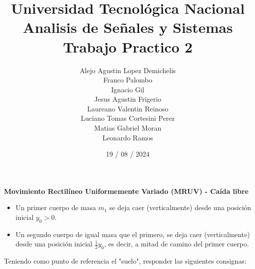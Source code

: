 \documentclass[12pt,a4paper]{report}
\title{%
  \fontsize{25}{0}\selectfont Universidad Tecnológica Nacional \\
  \fontsize{22}{30}\selectfont Analisis de Señales y Sistemas \\
  \fontsize{20}{25}\selectfont Trabajo Practico 2
}
\author{
Alejo Agustin Lopez Demichelis\\
Franco Palombo\\
Ignacio Gil\\
Jesus Agustin Frigerio\\
Laureano Valentin Reinoso\\
Luciano Tomas Cortesini Perez\\
Matias Gabriel Moran\\
Leonardo Ramos\\
}
\date{19 / 08 / 2024}
\begin{document}
\maketitle

\chapter{}%

\textbf{Movimiento Rectilíneo Uniformemente Variado (MRUV) - Caída libre}

\begin{itemize}[left=0pt]
  \item Un primer cuerpo de masa $m_1$ se deja caer (verticalmente) desde una posición inicial $y_0 > 0$.

  \item Un segundo cuerpo de igual masa que el primero, se deja caer (verticalmente) desde una posición inicial 
     $\frac{1}{2} y_0$, es decir, a mitad de camino del primer cuerpo.

\end{itemize}

Teniendo como punto de referencia el "suelo", responder las siguientes consignas:
\end{document}
